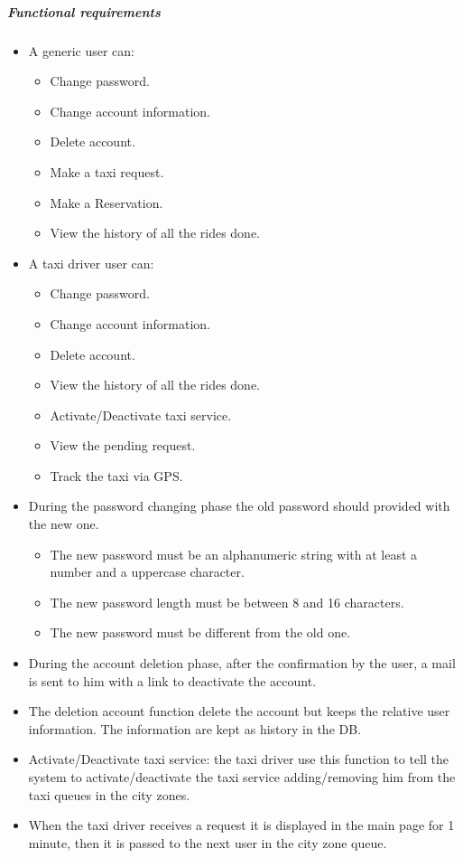 	\subparagraph{Functional requirements}
	\noindent
		\begin{itemize}
			\item A generic user can:
			\begin{itemize}
				\item Change password.
				\item Change account information.
				\item Delete account.
				\item Make a taxi request.
				\item Make a Reservation.
				\item View the history of all the rides done.
			\end{itemize}
			\item A taxi driver user can:
			\begin{itemize}
				\item Change password.
				\item Change account information.
				\item Delete account.
				\item View the history of all the rides done.
				\item Activate/Deactivate taxi service.
				\item View the pending request.
				\item Track the taxi via GPS.
			\end{itemize}
			
			\item During the password changing phase the old password should provided with the new one.
			\begin{itemize}
				\item The new password must be an alphanumeric string with at least a number and a uppercase character.
				\item The new password length must be between 8 and 16 characters. 
				\item The new password must be different from the old one.
			\end{itemize}
			\item During the account deletion phase, after the confirmation by the user, a mail is sent to him with a link to deactivate the account.
			\item The deletion account function delete the account but keeps the relative user information. The information are kept as history in the DB.
			\item Activate/Deactivate taxi service: the taxi driver use this function to tell the system to activate/deactivate the taxi service adding/removing him from the taxi queues in the city zones.
			\item When the taxi driver receives a request it is displayed in the main page for 1 minute, then it is passed to the next user in the city zone queue.
		\end{itemize}


